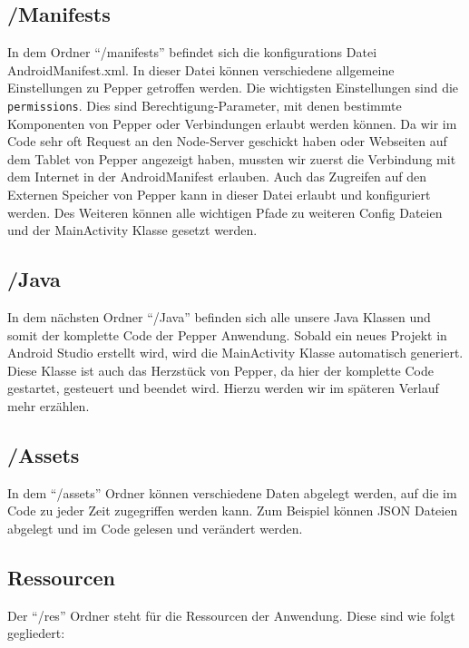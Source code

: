 \subsection*{/Manifests}
In dem Ordner ``/manifests'' befindet sich die konfigurations Datei AndroidManifest.xml. In dieser Datei können verschiedene allgemeine 
Einstellungen zu Pepper getroffen werden. Die wichtigsten Einstellungen sind die \verb|permissions|. Dies sind Berechtigung-Parameter, mit 
denen bestimmte Komponenten von Pepper oder Verbindungen erlaubt werden können. Da wir im Code sehr oft Request an den Node-Server 
geschickt haben oder Webseiten auf dem Tablet von Pepper angezeigt haben, mussten wir zuerst die Verbindung mit dem Internet in der 
AndroidManifest erlauben. Auch das Zugreifen auf den Externen Speicher von Pepper kann in dieser Datei erlaubt und konfiguriert werden. 
Des Weiteren können alle wichtigen Pfade zu weiteren Config Dateien und der MainActivity Klasse gesetzt werden.\\

\subsection*{/Java}
In dem nächsten Ordner ``/Java'' befinden sich alle unsere Java Klassen und somit der komplette Code der Pepper Anwendung. Sobald ein 
neues Projekt in Android Studio erstellt wird, wird die MainActivity Klasse automatisch generiert. Diese Klasse ist auch das Herzstück 
von Pepper, da hier der komplette Code gestartet, gesteuert und beendet wird. Hierzu werden wir im späteren Verlauf mehr erzählen. \\


\subsection*{/Assets}

In dem ``/assets'' Ordner können verschiedene Daten abgelegt werden, auf die im Code zu jeder Zeit zugegriffen werden kann. 
Zum Beispiel können JSON Dateien abgelegt und im Code gelesen und verändert werden.\\

\subsection{Ressourcen}
Der ``/res'' Ordner steht für die Ressourcen der Anwendung. Diese sind wie folgt gegliedert:\\

